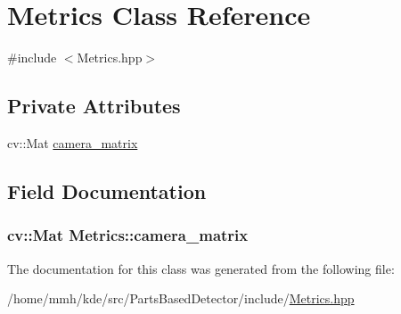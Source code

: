 \hypertarget{classMetrics}{\section{Metrics Class Reference}
\label{classMetrics}
}


{\ttfamily \#include $<$Metrics.\-hpp$>$}

\subsection*{Private Attributes}
\begin{DoxyCompactItemize}
\item 
cv\-::\-Mat \hyperlink{classMetrics_aba72e7e31eb9057d1252e61cdf3aa904}{camera\-\_\-matrix}
\end{DoxyCompactItemize}


\subsection{Field Documentation}
\hypertarget{classMetrics_aba72e7e31eb9057d1252e61cdf3aa904}{
\subsubsection[{camera\-\_\-matrix}]{\setlength{\rightskip}{0pt plus 5cm}cv\-::\-Mat Metrics\-::camera\-\_\-matrix\hspace{0.3cm}{\ttfamily [private]}}}\label{classMetrics_aba72e7e31eb9057d1252e61cdf3aa904}


The documentation for this class was generated from the following file\-:\begin{DoxyCompactItemize}
\item 
/home/mmh/kde/src/\-Parts\-Based\-Detector/include/\hyperlink{Metrics_8hpp}{Metrics.\-hpp}\end{DoxyCompactItemize}
